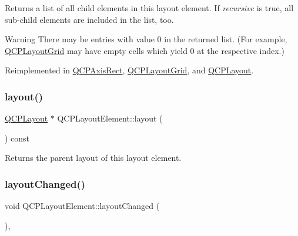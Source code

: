 Returns a list of all child elements in this layout element. If {\itshape recursive} is true, all sub-\/child elements are included in the list, too.

\begin{DoxyWarning}{Warning}
There may be entries with value 0 in the returned list. (For example, \mbox{\hyperlink{class_q_c_p_layout_grid}{Q\+C\+P\+Layout\+Grid}} may have empty cells which yield 0 at the respective index.) 
\end{DoxyWarning}


Reimplemented in \mbox{\hyperlink{class_q_c_p_axis_rect_a3aee067fd105f2fa8de9eb8024435ac5}{Q\+C\+P\+Axis\+Rect}}, \mbox{\hyperlink{class_q_c_p_layout_grid_a7d5b968b4cf57393e9e387976d91f8f7}{Q\+C\+P\+Layout\+Grid}}, and \mbox{\hyperlink{class_q_c_p_layout_aca129722c019f91d3367046f80abfa77}{Q\+C\+P\+Layout}}.

\mbox{\label{class_q_c_p_layout_element_a4efdcbde9d28f410e5ef166c9d691deb}} 
\subsubsection{\texorpdfstring{layout()}{layout()}}
{\footnotesize\ttfamily \mbox{\hyperlink{class_q_c_p_layout}{Q\+C\+P\+Layout}} $\ast$ Q\+C\+P\+Layout\+Element\+::layout (\begin{DoxyParamCaption}{ }\end{DoxyParamCaption}) const\hspace{0.3cm}{\ttfamily [inline]}}

Returns the parent layout of this layout element. \mbox{\label{class_q_c_p_layout_element_a765f041a73af0c2de41b41a5a03e31a4}} 
\subsubsection{\texorpdfstring{layoutChanged()}{layoutChanged()}}
{\footnotesize\ttfamily void Q\+C\+P\+Layout\+Element\+::layout\+Changed (\begin{DoxyParamCaption}{ }\end{DoxyParamCaption})\hspace{0.3cm}{\ttfamily [protected]}, {\ttfamily [virtual]}}



